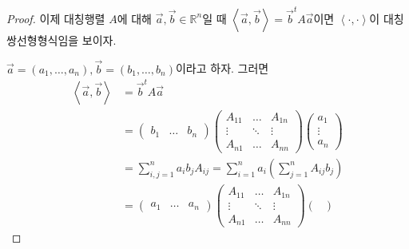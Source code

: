 \documentclass[../engineering_mathematics_lecture_note.tex]{subfiles}
\begin{document}
\begin{proof}
    이제 대칭행렬 $A$에 대해 $\vec a, \vec b \in \mathbb R^n$일 때 $\left<\vec a, \vec b\right> = \vec b^t A \vec a$이면 $\left<\cdot, \cdot\right>$이 대칭 쌍선형형식임을 보이자.

    $\vec a = (a_1, \dots, a_n), \vec b = (b_1, \dots, b_n)$이라고 하자.
    그러면
    \begin{align*}
        \left<\vec a, \vec b\right> &= \vec b^t A \vec a\\
                                    &=
                                    \begin{pmatrix}
                                        b_1 & \dots & b_n
                                    \end{pmatrix}
                                    \begin{pmatrix}
                                        A_{11} & \dots & A_{1n}\\
                                        \vdots & \ddots & \vdots\\
                                        A_{n1} & \dots & A_{nn}
                                    \end{pmatrix}
                                    \begin{pmatrix}
                                        a_1\\
                                        \vdots\\
                                        a_n
                                    \end{pmatrix}\\
                                    &= \sum_{i, j = 1}^n a_i b_j A_{ij} = \sum_{i = 1}^n a_i \left(\sum_{j = 1}^n A_{ij} b_j\right)\\
                                    &=
                                    \begin{pmatrix}
                                        a_1 & \dots & a_n
                                    \end{pmatrix}
                                    \begin{pmatrix}
                                        A_{11} & \dots & A_{1n}\\
                                        \vdots & \ddots & \vdots\\
                                        A_{n1} & \dots & A_{nn}
                                    \end{pmatrix}
                                    \begin{pmatrix}

\end{pmatrix}
\end{align*}
\end{proof}
\end{document}
